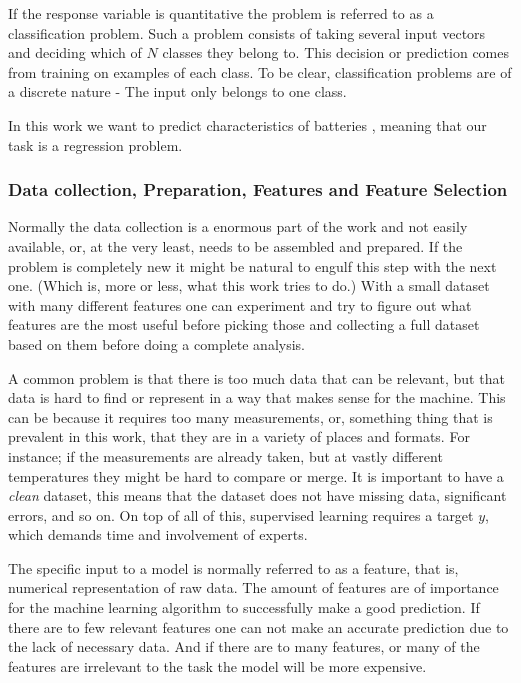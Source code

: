 	If the response variable is quantitative the problem is referred to as a classification problem. Such a problem consists of taking several input vectors and deciding which of $N$ classes they belong to. This decision or prediction comes from training on examples of each class. To be clear, classification problems are of a discrete nature - The input only belongs to one class.
	
	In this work we want to predict characteristics of batteries , meaning  that our task is a regression problem.
	
	\subsubsection{Data collection, Preparation, Features and Feature Selection}
	 
	Normally the data collection is a enormous part of the work and not easily available, or, at the very least, needs to be assembled and prepared. If the problem is completely new it might be natural to engulf this step with the next one. (Which is, more or less, what this work tries to do.) With a small dataset with many different features one can experiment and try to figure out what features are the most useful before picking those and collecting a full dataset based on them before doing a complete analysis. 
	
	A common problem is that there is too much data that can be relevant, but that data is hard to find or represent in a way that makes sense for the machine. This can be because it requires too many measurements, or, something thing that is prevalent in this work, that they are in a variety of places and formats. For instance; if the measurements are already taken, but at vastly different temperatures they might be hard to compare or merge. It is important to have a \textit{clean} dataset, this means that the dataset does not have missing data, significant errors, and so on. On top of all of this, supervised learning requires a target $y$, which demands time and involvement of experts. 
	
	The specific input to a model is normally referred to as a feature, that is, numerical representation of raw data. The amount of features are of importance for the machine learning algorithm to successfully make a good prediction. If there are to few relevant features one can not make an accurate prediction due to the lack of necessary data. And if there are to many features, or many of the features are irrelevant to the task the model will be more expensive.
	
